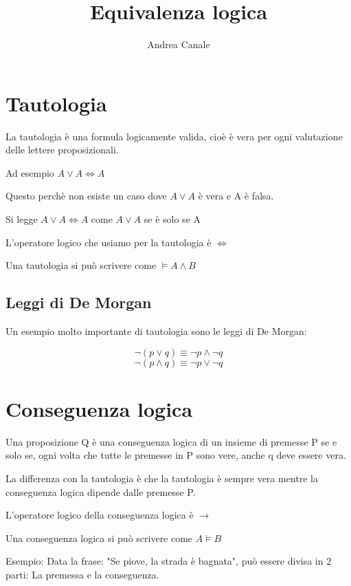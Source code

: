 \documentclass[a4paper]{article}
\title{Equivalenza logica}
\author{Andrea Canale}
\begin{document}
	
\maketitle

\begin{spacing}{2.8}
	\tableofcontents
\end{spacing}
\section{Tautologia}

La tautologia è una formula logicamente valida, cioè è vera per ogni valutazione delle lettere proposizionali.

Ad esempio $ A \lor A \Longleftrightarrow A $

Questo perchè non esiste un caso dove $ A \lor A $ è vera e A è falsa.

Si legge $ A \lor A \Longleftrightarrow A $ come $ A \lor A $ se è solo se A

L'operatore logico che usiamo per la tautologia è $ \Longleftrightarrow $

Una tautologia si può scrivere come $ \models A \land B $

\subsection{Leggi di De Morgan}

Un esempio molto importante di tautologia sono le leggi di De Morgan:

$$ \neg(p \lor q) \equiv \neg p \land \neg q $$
$$ \neg(p \land q) \equiv \neg p \lor \neg q $$

\section{Conseguenza logica}

Una proposizione Q è una conseguenza logica di un insieme di premesse P se e solo se, ogni volta che tutte le premesse in P sono vere, anche q deve essere vera.

La differenza con la tautologia è che la tautologia è sempre vera mentre la conseguenza logica dipende dalle premesse P.

L'operatore logico della conseguenza logica è $ \rightarrow $

Una conseguenza logica si può scrivere come $ A \models B $

Esempio: Data la frase: "Se piove, la strada è bagnata", può essere divisa in 2 parti: La premessa e la conseguenza.
\end{document}
